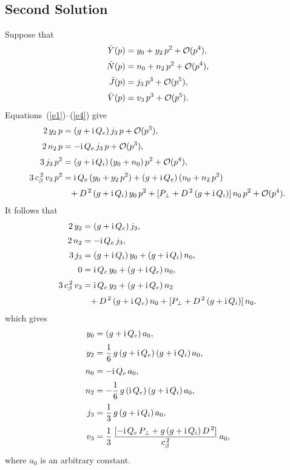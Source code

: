 \documentclass[12pt,prb,aps,notitlepage]{revtex4-1}
\begin{document}
\subsection{Second Solution}
Suppose that 
\begin{align}
\bar{Y}(p) &=y_{0}+ y_2\,p^2+{ \cal O}(p^4),\\[0.5ex]
\bar{N}(p) &= n_{0}+n_2\,p^2+{ \cal O}(p^4),\\[0.5ex]
\bar{J}(p) &= j_3\,p^3+{ \cal O}(p^5),\\[0.5ex]
\bar{V}(p) &= v_3\,p^3+{ \cal O}(p^5).
\end{align}
Equations~(\ref{e1})--(\ref{e4}) give 
\begin{align}
2\, y_2\,p &= (g+{\rm i}\,Q_e)\,j_3\,p + {\cal O}(p^3),\\[0.5ex]
2\, n_2\,p &= -{\rm i}\,Q_e\,j_3\,p+ {\cal O}(p^3),\\[0.5ex]
3\,j_3\,p^2 &= (g+{\rm i}\,Q_i)\,(y_0+n_0)\,p^2+ {\cal O}(p^4),\\[0.5ex]
3\,c_\beta^{\,2}\,v_3\,p^2 &={\rm i}\,Q_e\,(y_{0} +y_2\,p^2) + (g+{\rm i}\,Q_e)\,(n_0+ n_2\,p^2)\nonumber\\[0.5ex]&\phantom{=}
+ D^{\,2}\,(g+{\rm i}\,Q_i)\,y_0\,p^2 + [P_\perp + D^{\,2}\,(g+{\rm i}\,Q_i)]\,n_0\,p^2+ {\cal O}(p^4).
\end{align}
It follows that
\begin{align}
2\,y_2&= (g+{\rm i}\,Q_e)\,j_3,\\[0.5ex]
2\,n_2&= -{\rm i}\,Q_e\,j_3,\\[0.5ex]
3\,j_3&= (g+{\rm i}\,Q_i)\,y_0 + (g+{\rm i}\,Q_i)\,n_0,\\[0.5ex]
0 &= {\rm i}\,Q_e\,y_0 + (g+{\rm i}\,Q_e)\,n_0,\\[0.5ex]
3\,c_\beta^{\,2}\,v_3 &= {\rm i}\,Q_e\,y_2 + (g+{\rm i}\,Q_e)\,n_2 \nonumber\\[0.5ex]
&\phantom{=}+D^{\,2}\,(g+{\rm i}\,Q_e)\,n_0 + [P_\perp + D^{\,2}\,(g+{\rm i}\,Q_i)]\,n_0.
\end{align}
which gives
\begin{align}
y_0 &= (g+{\rm i}\,Q_e)\,a_0,\\[0.5ex]
y_2 &= \frac{1}{6}\,g\,(g+{\rm i}\,Q_e)\,(g+{\rm i}\,Q_i)\,a_0,\\[0.5ex]
n_0 &= -{\rm i}\,Q_e\,a_0,\\[0.5ex]
n_2 &= -\frac{1}{6}\,g\,({\rm i}\,Q_e)\,(g+{\rm i}\,Q_i)\,a_0,\\[0.5ex]
j_3 &= \frac{1}{3}\,g\,(g+{\rm i}\,Q_i)\,a_0,\\[0.5ex]
v_3 &= \frac{1}{3}\,\frac{[-{\rm i}\,Q_e\,P_\perp + g\,(g+{\rm i }\,Q_i)\,D^{\,2}]}{c_\beta^{\,2}}\,a_0,
\end{align}
where $a_0$ is an arbitrary constant. 
\end{document}
